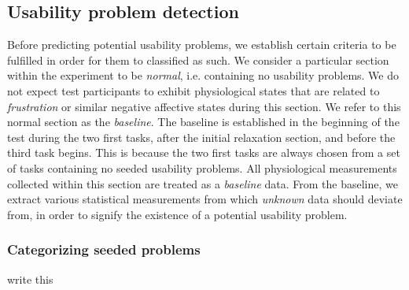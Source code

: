 \subsection{Usability problem detection}
Before predicting potential usability problems, we establish certain criteria to be fulfilled in order for them to
classified as such.  We consider a particular section within the experiment to be \textit{normal}, i.e. containing no
usability problems.  We do not expect test participants to exhibit physiological states that are related to
\textit{frustration} or similar negative affective states during this section. We refer to this normal section as the
\textit{baseline}. The baseline is established in the beginning of the test during the two first tasks, after the
initial relaxation section, and before the third task begins. This is because the two first tasks are always chosen from
a set of tasks containing no seeded usability problems. All physiological measurements collected within this section are
treated as a \textit{baseline} data.  From the baseline, we extract various statistical measurements from which
\textit{unknown} data should deviate from, in order to signify the existence of a potential usability problem.

\subsubsection{Categorizing seeded problems}
write this


